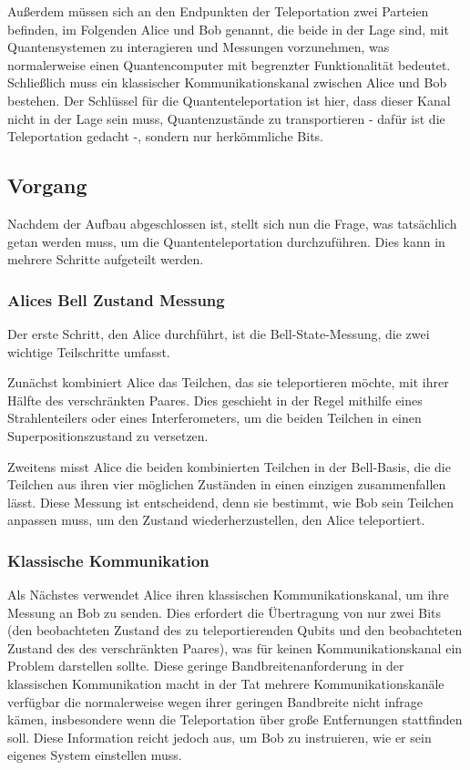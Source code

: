 Außerdem müssen sich an den Endpunkten der Teleportation zwei Parteien befinden, im Folgenden Alice und Bob genannt, die beide in der Lage sind, mit Quantensystemen zu interagieren und Messungen vorzunehmen, was normalerweise einen Quantencomputer mit begrenzter Funktionalität bedeutet.
Schließlich muss ein klassischer Kommunikationskanal zwischen Alice und Bob bestehen.
Der Schlüssel für die Quantenteleportation ist hier, dass dieser Kanal nicht in der Lage sein muss, Quantenzustände zu transportieren - dafür ist die Teleportation gedacht -, sondern nur herkömmliche Bits.


\subsection{Vorgang}\label{subsec:process}

Nachdem der Aufbau abgeschlossen ist, stellt sich nun die Frage, was tatsächlich getan werden muss, um die Quantenteleportation durchzuführen.
Dies kann in mehrere Schritte aufgeteilt werden.

\subsubsection{Alices Bell Zustand Messung}
Der erste Schritt, den Alice durchführt, ist die Bell-State-Messung, die zwei wichtige Teilschritte umfasst.

Zunächst kombiniert Alice das Teilchen, das sie teleportieren möchte, mit ihrer Hälfte des verschränkten Paares.
Dies geschieht in der Regel mithilfe eines Strahlenteilers oder eines Interferometers, um die beiden Teilchen in einen Superpositionszustand zu versetzen.

Zweitens misst Alice die beiden kombinierten Teilchen in der Bell-Basis, die die Teilchen aus ihren vier möglichen Zuständen in einen einzigen zusammenfallen lässt.
Diese Messung ist entscheidend, denn sie bestimmt, wie Bob sein Teilchen anpassen muss, um den Zustand wiederherzustellen, den
Alice teleportiert.
\subsubsection{Klassische Kommunikation}
Als Nächstes verwendet Alice ihren klassischen Kommunikationskanal, um ihre Messung an Bob zu senden.
Dies erfordert die Übertragung von nur zwei Bits (den beobachteten Zustand des zu teleportierenden Qubits und den beobachteten Zustand des
des verschränkten Paares), was für keinen Kommunikationskanal ein Problem darstellen sollte.
Diese geringe Bandbreitenanforderung in der klassischen Kommunikation macht in der Tat mehrere Kommunikationskanäle verfügbar
die normalerweise wegen ihrer geringen Bandbreite nicht infrage kämen, insbesondere wenn die Teleportation über große
Entfernungen stattfinden soll.
Diese Information reicht jedoch aus, um Bob zu instruieren, wie er sein eigenes System einstellen muss.
